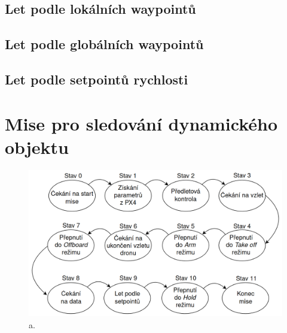 \subsection{Let podle lokálních waypointů}

\subsection{Let podle globálních waypointů}

\subsection{Let podle setpointů rychlosti}

\section{Mise pro sledování dynamického objektu}

\begin{figure}[!ht]
  \begin{center}
    \includegraphics[scale=0.33]{obrazky/MISE2}
  \end{center}
  \caption[a]{a.}
  \label{fig:MISE2}
\end{figure}
